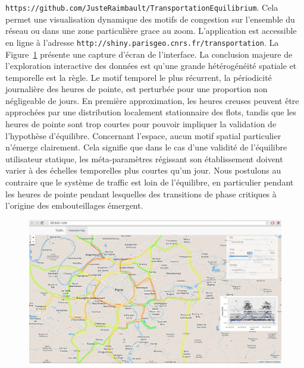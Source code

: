{{\texttt{https://github.com/JusteRaimbault/TransportationEquilibrium}}.
Cela permet une visualisation dynamique des motifs de congestion sur l'ensemble du réseau ou dans une zone particulière grace au zoom. L'application est accessible en ligne à l'adresse \texttt{http://shiny.parisgeo.cnrs.fr/transportation}. La Figure~\ref{fig:fig-1} présente une capture d'écran de l'interface. La conclusion majeure de l'exploration interactive des données est qu'une grande hétérogénéité spatiale et temporelle est la règle. Le motif temporel le plus récurrent, la périodicité journalière des heures de pointe, est perturbée pour une proportion non négligeable de jours. En première approximation, les heures creuses peuvent être approchées par une distribution localement stationnaire des flots, tandis que les heures de pointe sont trop courtes pour pouvoir impliquer la validation de l'hypothèse d'équilibre. Concernant l'espace, aucun motif spatial particulier n'émerge clairement. Cela signifie que dans le cas d'une validité de l'équilibre utilisateur statique, les méta-paramètres régissant son établissement doivent varier à des échelles temporelles plus courtes qu'un jour. Nous postulons au contraire que le système de traffic est loin de l'équilibre, en particulier pendant les heures de pointe pendant lesquelles des transitions de phase critiques à l'origine des embouteillages émergent.
}
 


\begin{figure}
\vspace{1cm}
\centering
\includegraphics[width=\textwidth]{Figures/TransportationEquilibrium/gr1}
\caption{}
\label{fig:fig-1}
\end{figure}



